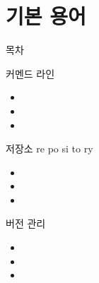\documentclass[aspectratio=1610,20pt,xcolor=pdftex,dvipsnames,table,handout]{beamer}
\begin{document}
		\part{기본 용어}
		\frame{\partpage}

\label{part1} 	%

		\begin{frame} [plain]{목차}
		\tableofcontents%
		\end{frame}

		\begin{frame} [t,plain]

			\begin{block} { 커멘드 라인 }
			\setlength{\leftmargini}{1em}			
			\begin{itemize}
				\item 	
				\item 	
				\item 	
			\end{itemize}
			\end{block}						

		\end{frame}						

		\begin{frame} [t,plain]

			\begin{block} { 저장소 re po si to ry }
			\setlength{\leftmargini}{1em}			
			\begin{itemize}
				\item 	
				\item 	
				\item 	
			\end{itemize}
			\end{block}						

		\end{frame}						

		\begin{frame} [t,plain]

			\begin{block} { 버전 관리 }
			\setlength{\leftmargini}{1em}			
			\begin{itemize}
				\item 	
				\item 	
				\item 	
			\end{itemize}
			\end{block}						

		\end{frame}						
\end{document}
